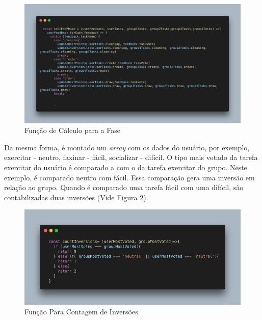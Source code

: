\begin{figure}[htbp]
	\caption{Função de Cálculo para a Fase}
	\begin{center}
	\includegraphics[keepaspectratio=true,scale=0.41]{figuras/code-calForPhase.png}
	\end{center}
    \label{fig16}
\end{figure}

Da mesma forma, é montado um \emph{array} com os dados 
do usuário, por exemplo, exercitar - neutro, 
faxinar - fácil, socializar - difícil. O tipo mais votado da tarefa exercitar do usuário é comparado a com o da tarefa 
exercitar do grupo. 
Neste exemplo, é comparado neutro com fácil. Essa comparação gera uma inversão em relação ao grupo. 
Quando é comparado uma tarefa fácil com uma difícil, são contabilizadas duas inversões (Vide Figura \ref{fig18}). 

\begin{figure}[htbp]
	\caption{Função Para Contagem de Inversões}
	\begin{center}
	\includegraphics[keepaspectratio=true,scale=0.5]{figuras/code-countInversions.png}
	\end{center}
    \label{fig18}
\end{figure}



